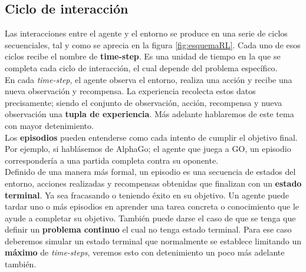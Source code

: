 \documentclass[11pt,fleqn]{book} %
\begin{document}

\subsection{Ciclo de interacción}\label{sec:episodios}


Las interacciones entre el agente y el entorno se produce en una serie de ciclos secuenciales, tal y como se aprecia en la figura \ref{fig:esquemaRL}. Cada uno de esos ciclos recibe el nombre de \textbf{time-step}. Es una unidad de tiempo en la que se completa cada ciclo de interacción, el cual depende del problema específico. \\

En cada \textit{time-step}, el agente observa el entorno, realiza una acción y recibe una nueva observación y recompensa. La experiencia recolecta estos datos precisamente; siendo el conjunto de observación, acción, recompensa y nueva observación una \textbf{tupla de experiencia}. Más adelante hablaremos de este tema con mayor detenimiento. \\

Los \textbf{episodios} pueden entenderse como cada intento de cumplir el objetivo final. Por ejemplo, si hablásemos de AlphaGo; el agente que juega a GO, un episodio correspondería a una partida completa contra su oponente. \\

Definido de una manera más formal, un episodio es una secuencia de estados del entorno, acciones realizadas y recompensas obtenidas que finalizan con un \textbf{estado terminal}. Ya sea fracasando o teniendo éxito en su objetivo. Un agente puede tardar uno o más episodios en aprender una tarea concreta o conocimiento que le ayude a completar su objetivo. También puede darse el caso de que se tenga que definir un \textbf{problema continuo} el cual no tenga estado terminal. Para ese caso deberemos simular un estado terminal que normalmente se establece limitando un \textbf{máximo} de \textit{time-steps}, veremos esto con detenimiento un poco más adelante también. \\
\end{document}
